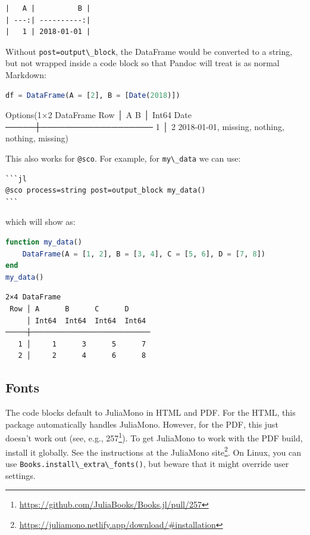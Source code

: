 \documentclass[
  notoc %
]{tufte-book}
\DeclareRobustCommand{\href}[2]{#2\footnote{\url{#1}}}
\newcommand{\passthrough}[1]{#1}
\begin{document}
\begin{lstlisting}[language=Output]
|   A |          B |
| ---:| ----------:|
|   1 | 2018-01-01 |

\end{lstlisting}

Without \passthrough{\lstinline!post=output\_block!}, the DataFrame
would be converted to a string, but not wrapped inside a code block so
that Pandoc will treat is as normal Markdown:

\begin{lstlisting}[language=Julia]
df = DataFrame(A = [2], B = [Date(2018)])
\end{lstlisting}

Options(1×2 DataFrame Row │ A B │ Int64 Date ─────┼─────────────────── 1
│ 2 2018-01-01, missing, nothing, nothing, missing)

This also works for \passthrough{\lstinline!@sco!}. For example, for
\passthrough{\lstinline!my\_data!} we can use:

\begin{lstlisting}
```jl
@sco process=string post=output_block my_data()
```
\end{lstlisting}

which will show as:

\begin{lstlisting}[language=Julia]
function my_data()
    DataFrame(A = [1, 2], B = [3, 4], C = [5, 6], D = [7, 8])
end
my_data()
\end{lstlisting}

\begin{lstlisting}[language=Output]
2×4 DataFrame
 Row │ A      B      C      D
     │ Int64  Int64  Int64  Int64
─────┼────────────────────────────
   1 │     1      3      5      7
   2 │     2      4      6      8
\end{lstlisting}

\hypertarget{fonts}{%
\subsection{Fonts}\label{fonts}}

The code blocks default to JuliaMono in HTML and PDF. For the HTML, this
package automatically handles JuliaMono. However, for the PDF, this just
doesn't work out (see, e.g.,
\href{https://github.com/JuliaBooks/Books.jl/pull/257}{257}). To get
JuliaMono to work with the PDF build, install it globally. See the
instructions at the
\href{https://juliamono.netlify.app/download/\#installation}{JuliaMono
site}. On Linux, you can use
\passthrough{\lstinline!Books.install\_extra\_fonts()!}, but beware that
it might override user settings.
\end{document}
